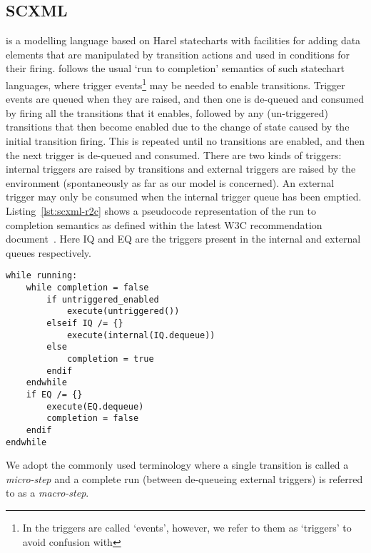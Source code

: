 
\subsection{SCXML}
\label{sec:scxml}

\SCXML is a modelling language based on Harel statecharts with facilities for adding data elements that are manipulated by transition actions and used in conditions for their firing. \SCXML follows the usual `run to completion' semantics of such statechart languages, where trigger events\footnote{In \SCXML the triggers are called `events', however, we refer to them as `triggers' to avoid confusion with \EventB} may be needed to enable transitions. Trigger events are queued when they are raised, and then one is de-queued and consumed by firing all the transitions that it enables, followed by any (un-triggered) transitions that then become enabled due to the change of state caused by the initial transition firing. This is repeated until no transitions are enabled, and then the next trigger is de-queued and consumed. There are two kinds of triggers: internal triggers are raised by transitions and external triggers are raised by the environment (spontaneously as far as our model is concerned). An external trigger may only be consumed when the internal trigger queue has been emptied. Listing~\ref{lst:scxml-r2c} shows a pseudocode representation of the run to completion semantics as defined within the latest W3C recommendation document~\cite{scxmlwebsite}. Here IQ and EQ are the triggers present in the internal and external queues respectively. 
\begin{lstlisting}[caption=Pseudocode for 'run to completion',label={lst:scxml-r2c}, frame=single]
while running:
	while completion = false
		if untriggered_enabled
			execute(untriggered())
		elseif IQ /= {}
			execute(internal(IQ.dequeue)) 
		else
			completion = true
		endif
	endwhile
	if EQ /= {}
		execute(EQ.dequeue) 
		completion = false
	endif
endwhile 
\end{lstlisting}

We adopt the commonly used terminology where a single transition is called a \emph{micro-step} and a complete run (between de-queueing external triggers) is referred to as a \emph{macro-step}.


